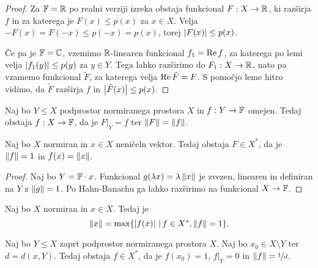 \begin{proof}
  Za $\mathbb{F} = \mathbb{R}$ po realni verziji izreka obstaja funkcional $F: X \to \mathbb{R}$, ki
  razširja $f$ in za katerega je $F(x) \le p(x)$ za $x \in X$.
  Velja $-F(x) = F(-x) \le p(-x) = p(x)$, torej $\left| F(x) \right| \le p(x)$.

  Če pa je $\mathbb{F} = \mathbb{C}$, vzemimo $\mathbb{R}$-linearen funkcional $f_1 = \operatorname{Re} f$, za
  katerega po lemi velja $\left| f_1(y) \right| \le p(y)$ za $y \in Y$.
  Tega lahko razširimo do $F_1: X \to \mathbb{R}$, nato pa vzamemo funkcional
  $\tilde{F}$, za katerega velja $\operatorname{Re} \tilde{F} = F$.
  S pomočjo leme hitro vidimo, da $\tilde{F}$ razširja $f$ in
  $\left| \tilde{F}(x) \right| \le p(x)$.
\end{proof}


\begin{izrek}
  Naj bo $Y \le X$ podprostor normiranega prostora $X$ in $f: Y \to \mathbb{F}$ omejen.
  Tedaj obstaja $f: X \to \mathbb{F}$, da je $\left. F \right|_Y = f$ ter $\left\lVert F\right\rVert =
  \left\lVert f\right\rVert$.
\end{izrek}


\begin{posledica}
  Naj bo $X$ normiran in $x \in X$ neničeln vektor.
  Tedaj obstaja $F \in X^*$, da je $\left\lVert f\right\rVert = 1$ in $f(x) = \left\lVert x\right\rVert$.
\end{posledica}

\begin{proof}
  Naj bo $Y = \mathbb{F} \cdot x$.
  Funkcional $g(\lambda x) = \lambda \left\lVert x\right\rVert$ je zvezen, linearen in definiran
  na $Y$ z $\left\lVert g\right\rVert = 1$.
  Po Hahn-Banachu ga lahko razširimo na funkcional $X \to \mathbb{F}$.
\end{proof}

\begin{posledica}
  Naj bo $X$ normiran in $x \in X$.
  Tedaj je
  \[
	\left\lVert x\right\rVert = \max \{\left| f(x) \right| \,|\, f \in X^*, \left\lVert f\right\rVert = 1\}.
  \]
\end{posledica}


\begin{posledica}
  Naj bo $Y \le X$ zaprt podprostor normiranega prostora $X$.
  Naj bo $x_0 \in X \setminus Y$ ter $d = d(x,Y)$.
  Tedaj obstaja $f \in X^*$, da je $f(x_0) = 1$, $\left. f \right|_Y = 0$ in
  $\left\lVert f\right\rVert = \nicefrac{1}{d}$.
\end{posledica}

